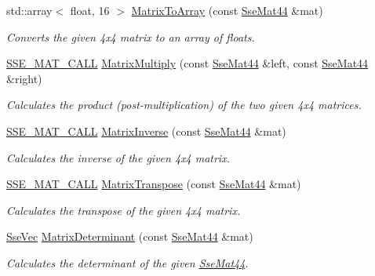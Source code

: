 {\bf }\par
\begin{DoxyCompactItemize}
\item 
std\+::array$<$ float, 16 $>$ \hyperlink{namespacegfxmath_a5f87ab4eb6093d145cda3e6772c6bc0a}{Matrix\+To\+Array} (const \hyperlink{classgfxmath_1_1_sse_mat44}{Sse\+Mat44} \&mat)
\begin{DoxyCompactList}\small\item\em Converts the given 4x4 matrix to an array of floats. \end{DoxyCompactList}\item 
\hyperlink{ssemat__math__defs_8h_a741f88d5589197d03fea9ab2b7622b8a}{S\+S\+E\+\_\+\+M\+A\+T\+\_\+\+C\+A\+L\+L} \hyperlink{namespacegfxmath_ab38872b965a424d2660e1c4be71ddbe6}{Matrix\+Multiply} (const \hyperlink{classgfxmath_1_1_sse_mat44}{Sse\+Mat44} \&left, const \hyperlink{classgfxmath_1_1_sse_mat44}{Sse\+Mat44} \&right)
\begin{DoxyCompactList}\small\item\em Calculates the product (post-\/multiplication) of the two given 4x4 matrices. \end{DoxyCompactList}\item 
\hyperlink{ssemat__math__defs_8h_a741f88d5589197d03fea9ab2b7622b8a}{S\+S\+E\+\_\+\+M\+A\+T\+\_\+\+C\+A\+L\+L} \hyperlink{namespacegfxmath_a7d63a634b20c220ad6047dc4633bf70f}{Matrix\+Inverse} (const \hyperlink{classgfxmath_1_1_sse_mat44}{Sse\+Mat44} \&mat)
\begin{DoxyCompactList}\small\item\em Calculates the inverse of the given 4x4 matrix. \end{DoxyCompactList}\item 
\hyperlink{ssemat__math__defs_8h_a741f88d5589197d03fea9ab2b7622b8a}{S\+S\+E\+\_\+\+M\+A\+T\+\_\+\+C\+A\+L\+L} \hyperlink{namespacegfxmath_a8c2545c52a86496bdf8917a1158f6f24}{Matrix\+Transpose} (const \hyperlink{classgfxmath_1_1_sse_mat44}{Sse\+Mat44} \&mat)
\begin{DoxyCompactList}\small\item\em Calculates the transpose of the given 4x4 matrix. \end{DoxyCompactList}\item 
\hyperlink{namespacegfxmath_a0de2243e2b8d0fd46d3af5e036423004}{Sse\+Vec} \hyperlink{namespacegfxmath_a6709364ddedc83299a1d6a58607a87aa}{Matrix\+Determinant} (const \hyperlink{classgfxmath_1_1_sse_mat44}{Sse\+Mat44} \&mat)
\begin{DoxyCompactList}\small\item\em Calculates the determinant of the given \hyperlink{classgfxmath_1_1_sse_mat44}{Sse\+Mat44}. \end{DoxyCompactList}\item 

\end{DoxyCompactItemize}
